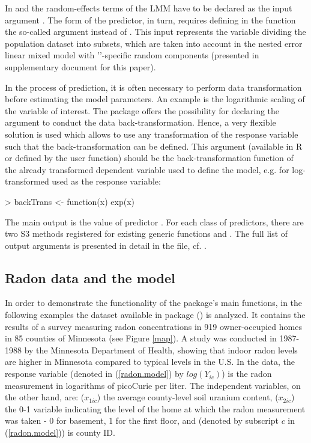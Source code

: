 In  and  the random-effects terms of the LMM have to be declared as the input argument . The form of the  predictor, in turn, requires defining in the  function the so-called  argument instead of . This input represents the variable dividing the population dataset into subsets, which are taken into account in the nested error linear mixed model with ''-specific random components (presented in supplementary document for this paper).

In the process of prediction, it is often necessary to perform data transformation before estimating the model parameters. An example is the logarithmic scaling of the variable of interest. The  package offers the possibility for declaring the argument  to conduct the data back-transformation. Hence, a very flexible solution is used which allows to use any transformation of the response variable such that the back-transformation can be defined. This argument (available in R or defined by the user function) should be the back-transformation function of the already transformed dependent variable used to define the model, e.g. for log-transformed  used as the response variable:
\begin{example}
> backTrans <- function(x) exp(x)
\end{example}

The main output is the value of predictor . For each class of predictors, there are two S3 methods registered for existing generic functions  and . The full list of output arguments is presented in detail in the  file, cf. \cite{qape}.

\subsection{Radon data and the model}

In order to demonstrate the functionality of the package's main functions, in the following examples the  dataset available in  package (\cite{HLMdiag}) is analyzed. It contains the results of a survey measuring radon concentrations in 919 owner-occupied homes in 85 counties of Minnesota (see Figure \ref{map}). A study was conducted in 1987-1988 by the Minnesota Department of Health, showing that indoor radon levels are higher in Minnesota compared to typical levels in the U.S. In the data, the response variable   (denoted in (\ref{radon.model}) by $log(Y_{ic})$) is the radon measurement in logarithms of picoCurie per liter. The independent variables, on the other hand, are:  ($x_{1ic}$) the average county-level soil uranium content,  ($x_{2ic}$) the 0-1 variable indicating the level of the home at which the radon measurement was taken - 0 for basement, 1 for the first floor, and  (denoted by subscript $c$ in (\ref{radon.model})) is county ID.

